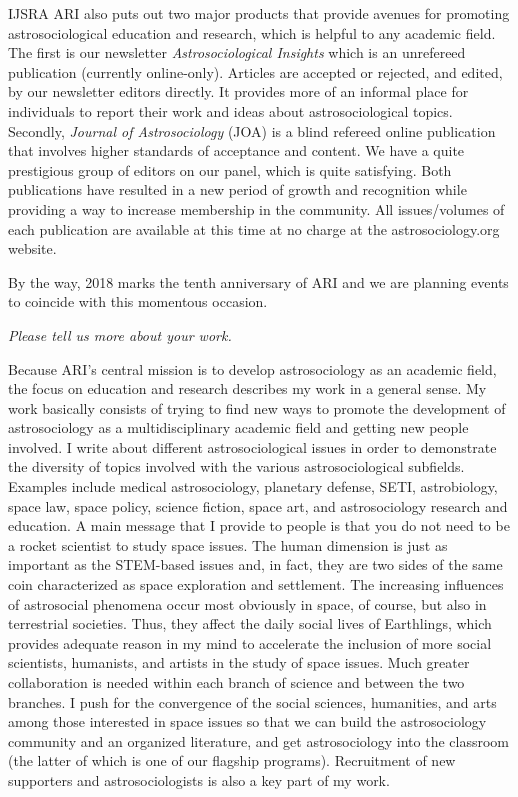 \begin{labeling}{IJSRA}
	ARI also puts out two major products that provide avenues for promoting astrosociological education and research, which is helpful to any academic field. The first is our newsletter \emph{Astrosociological Insights} which is an unrefereed publication (currently online-only). Articles are accepted or rejected, and edited, by our newsletter editors directly. It provides more of an informal place for individuals to report their work and ideas about astrosociological topics. Secondly, \emph{Journal of Astrosociology} (JOA) is a blind refereed online publication that involves higher standards of acceptance and content. We have a quite prestigious group of editors on our panel, which is quite satisfying. Both publications have resulted in a new period of growth and recognition while providing a way to increase membership in the community. All issues/volumes of each publication are available at this time at no charge at the astrosociology.org website.

	By the way, 2018 marks the tenth anniversary of ARI and we are planning events to coincide with this momentous occasion.

	\item[IJSRA] \emph{Please tell us more about your work.}

	\item[JP] Because ARI’s central mission is to develop astrosociology as an academic field, the focus on education and research describes my work in a general sense. My work basically consists of trying to find new ways to promote the development of astrosociology as a multidisciplinary academic field and getting new people involved. I write about different astrosociological issues in order to demonstrate the diversity of topics involved with the various astrosociological subfields. Examples include medical astrosociology, planetary defense, SETI, astrobiology, space law, space policy, science fiction, space art, and astrosociology research and education. A main message that I provide to people is that you do not need to be a rocket scientist to study space issues. The human dimension is just as important as the STEM-based issues and, in fact, they are two sides of the same coin characterized as space exploration and settlement. The increasing influences of astrosocial phenomena occur most obviously in space, of course, but also in terrestrial societies. Thus, they affect the daily social lives of Earthlings, which provides adequate reason in my mind to accelerate the inclusion of more social scientists, humanists, and artists in the study of space issues. Much greater collaboration is needed within each branch of science and between the two branches. I push for the convergence of the social sciences, humanities, and arts among those interested in space issues so that we can build the astrosociology community and an organized literature, and get astrosociology into the classroom (the latter of which is one of our flagship programs). Recruitment of new supporters and astrosociologists is also a key part of my work.


\end{labeling}
